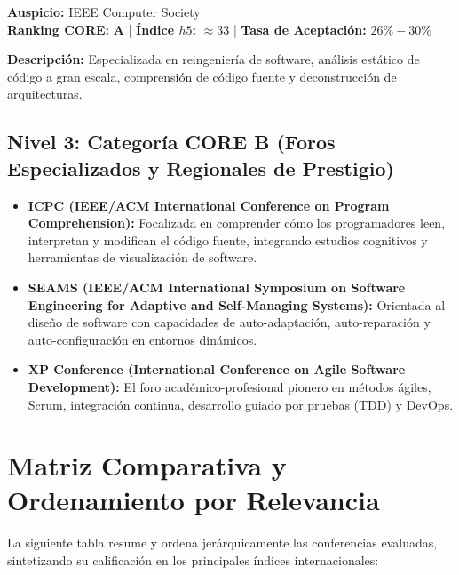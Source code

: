 \documentclass[12pt,a4paper]{article}
\begin{document}
\vspace{0.3cm}

\begin{tcolorbox}[colback=white,colframe=tierA,title={\textbf{12. SANER -- IEEE International Conference on Software Analysis, Evolution and Reengineering}},fonttitle=\bfseries]
\textbf{Auspicio:} IEEE Computer Society \\
\textbf{Ranking CORE:} \textbf{A} \quad | \quad \textbf{Índice $h5$:} $\approx 33$ \quad | \quad \textbf{Tasa de Aceptación:} $26\% - 30\%$
\end{tcolorbox}
\textbf{Descripción:} Especializada en reingeniería de software, análisis estático de código a gran escala, comprensión de código fuente y deconstrucción de arquitecturas.

\subsection{Nivel 3: Categoría CORE B (Foros Especializados y Regionales de Prestigio)}
\begin{itemize}[leftmargin=*]
    \item \textbf{ICPC (IEEE/ACM International Conference on Program Comprehension):} Focalizada en comprender cómo los programadores leen, interpretan y modifican el código fuente, integrando estudios cognitivos y herramientas de visualización de software.
    \item \textbf{SEAMS (IEEE/ACM International Symposium on Software Engineering for Adaptive and Self-Managing Systems):} Orientada al diseño de software con capacidades de auto-adaptación, auto-reparación y auto-configuración en entornos dinámicos.
    \item \textbf{XP Conference (International Conference on Agile Software Development):} El foro académico-profesional pionero en métodos ágiles, Scrum, integración continua, desarrollo guiado por pruebas (TDD) y DevOps.
\end{itemize}

\newpage
\section{Matriz Comparativa y Ordenamiento por Relevancia}

La siguiente tabla resume y ordena jerárquicamente las conferencias evaluadas, sintetizando su calificación en los principales índices internacionales:
\end{document}
